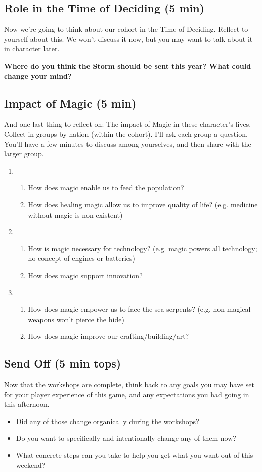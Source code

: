 \documentclass[green]{GL2020}
\begin{document}
\subsection*{Role in the Time of Deciding (5 min)}
Now we’re going to think about our cohort in the Time of Deciding. Reflect to yourself about this. We won't discuss it now, but you may want to talk about it in character later.

\textbf{Where do you think the Storm should be sent this year? What could change your mind?}

\subsection*{Impact of Magic (5 min)}
And one last thing to reflect on: The impact of Magic in these character’s lives. Collect in groups by nation (within the cohort). I’ll ask each group a question. You’ll have a few minutes to discuss among yourselves, and then share with the larger group.
\begin{enumerate}
	\item \pFarm{}
	\begin{enumerate}
		\item How does magic enable us to feed the population?
		\item How does healing magic allow us to improve quality of life? (e.g. medicine without magic is non-existent)
	\end{enumerate}
	\item \pTech{}
	\begin{enumerate}
		\item How is magic necessary for technology? (e.g. magic powers all technology; no concept of engines or batteries)
		\item How does magic support innovation?
	\end{enumerate}
	\item \pShip{}
	\begin{enumerate}
		\item How does magic empower us to face the sea serpents? (e.g. non-magical weapons won’t pierce the hide)
		\item How does magic improve our crafting/building/art?
	\end{enumerate}
\end{enumerate}

\subsection*{Send Off (5 min tops)}
Now that the workshops are complete, think back to any goals you may have set for your player experience of this game, and any expectations you had going in this afternoon. 
\begin{itemize}
	\item Did any of those change organically during the workshops? 
	\item Do you want to specifically and intentionally change any of them now? 
	\item What concrete steps can you take to help you get what you want out of this weekend?
\end{itemize}
\end{document}
